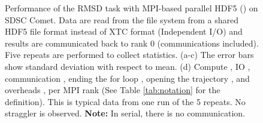 \begin{figure}[ht!]
\begin{subfigure} {.5\textwidth}
  \label{fig:MPIranks-hdf5}
\end{subfigure}
%
\caption{Performance of the RMSD task with MPI-based parallel HDF5 () on SDSC Comet.
Data are read from the file system from a shared HDF5 file format instead of XTC format (Independent I/O) and results are communicated back to rank 0 (communications included). 
Five repeats are performed to collect statistics. (a-c) The error bars show standard deviation with respect to mean. (d) Compute \tcomp, IO \tIO, communication \tcomm, ending the for loop ,
  opening the trajectory , and overheads ,   per MPI rank (See Table \ref{tab:notation} for the definition).
  This is typical data from one run of the 5 repeats. No straggler is observed. \textbf{Note:} In serial, there is no communication.}
\label{fig:MPIwithIO-hdf5}
\end{figure}
